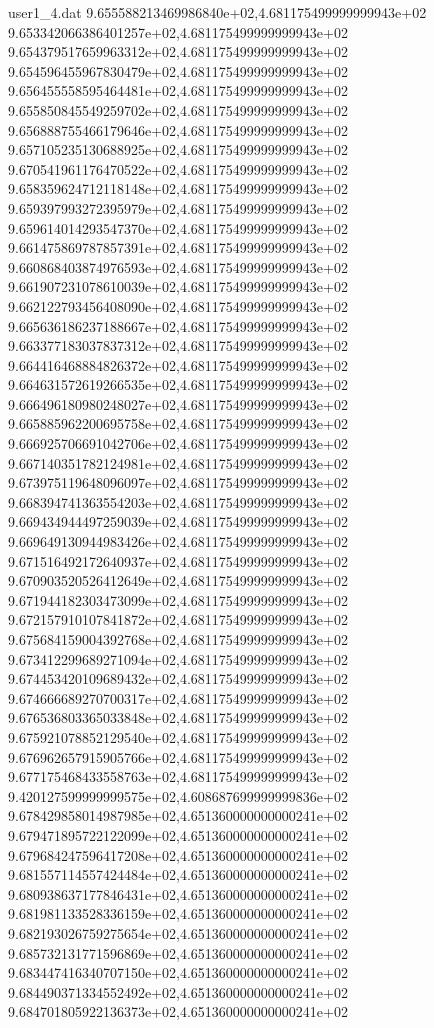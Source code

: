 \begin{filecontents}{user1_4.dat}
9.655588213469986840e+02,4.681175499999999943e+02
9.653342066386401257e+02,4.681175499999999943e+02
9.654379517659963312e+02,4.681175499999999943e+02
9.654596455967830479e+02,4.681175499999999943e+02
9.656455558595464481e+02,4.681175499999999943e+02
9.655850845549259702e+02,4.681175499999999943e+02
9.656888755466179646e+02,4.681175499999999943e+02
9.657105235130688925e+02,4.681175499999999943e+02
9.670541961176470522e+02,4.681175499999999943e+02
9.658359624712118148e+02,4.681175499999999943e+02
9.659397993272395979e+02,4.681175499999999943e+02
9.659614014293547370e+02,4.681175499999999943e+02
9.661475869787857391e+02,4.681175499999999943e+02
9.660868403874976593e+02,4.681175499999999943e+02
9.661907231078610039e+02,4.681175499999999943e+02
9.662122793456408090e+02,4.681175499999999943e+02
9.665636186237188667e+02,4.681175499999999943e+02
9.663377183037837312e+02,4.681175499999999943e+02
9.664416468884826372e+02,4.681175499999999943e+02
9.664631572619266535e+02,4.681175499999999943e+02
9.666496180980248027e+02,4.681175499999999943e+02
9.665885962200695758e+02,4.681175499999999943e+02
9.666925706691042706e+02,4.681175499999999943e+02
9.667140351782124981e+02,4.681175499999999943e+02
9.673975119648096097e+02,4.681175499999999943e+02
9.668394741363554203e+02,4.681175499999999943e+02
9.669434944497259039e+02,4.681175499999999943e+02
9.669649130944983426e+02,4.681175499999999943e+02
9.671516492172640937e+02,4.681175499999999943e+02
9.670903520526412649e+02,4.681175499999999943e+02
9.671944182303473099e+02,4.681175499999999943e+02
9.672157910107841872e+02,4.681175499999999943e+02
9.675684159004392768e+02,4.681175499999999943e+02
9.673412299689271094e+02,4.681175499999999943e+02
9.674453420109689432e+02,4.681175499999999943e+02
9.674666689270700317e+02,4.681175499999999943e+02
9.676536803365033848e+02,4.681175499999999943e+02
9.675921078852129540e+02,4.681175499999999943e+02
9.676962657915905766e+02,4.681175499999999943e+02
9.677175468433558763e+02,4.681175499999999943e+02
9.420127599999999575e+02,4.608687699999999836e+02
9.678429858014987985e+02,4.651360000000000241e+02
9.679471895722122099e+02,4.651360000000000241e+02
9.679684247596417208e+02,4.651360000000000241e+02
9.681557114557424484e+02,4.651360000000000241e+02
9.680938637177846431e+02,4.651360000000000241e+02
9.681981133528336159e+02,4.651360000000000241e+02
9.682193026759275654e+02,4.651360000000000241e+02
9.685732131771596869e+02,4.651360000000000241e+02
9.683447416340707150e+02,4.651360000000000241e+02
9.684490371334552492e+02,4.651360000000000241e+02
9.684701805922136373e+02,4.651360000000000241e+02

\end{filecontents}
